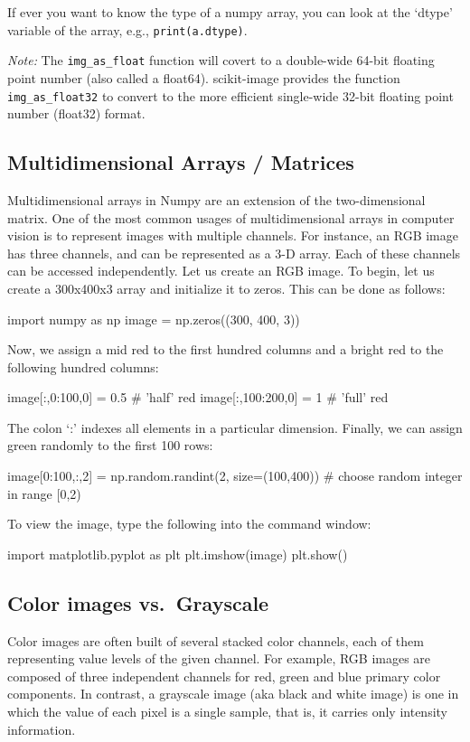 \documentclass{article}
\begin{document}
If ever you want to know the type of a numpy array, you can look at the `dtype' variable of the array, e.g., \texttt{print(a.dtype)}.

\emph{Note:} The \texttt{img\_as\_float} function will covert to a double-wide 64-bit floating point number (also called a float64). scikit-image provides the function \texttt{img\_as\_float32} to convert to the more efficient single-wide 32-bit floating point number (float32) format.

\subsection{Multidimensional Arrays / Matrices}
Multidimensional arrays in Numpy are an extension of the two-dimensional matrix. One of the most common usages of multidimensional arrays in computer vision is to represent images with multiple channels. For instance, an RGB image has three channels, and can be represented as a 3-D array. Each of these channels can be accessed independently.
Let us create an RGB image. To begin, let us create a 300x400x3 array and initialize it to zeros. This can be done as follows:
\begin{python}
import numpy as np
image = np.zeros((300, 400, 3))
\end{python}

Now, we assign a mid red to the first hundred columns and a bright red to the following hundred columns:
\begin{python}
image[:,0:100,0] = 0.5 # 'half' red
image[:,100:200,0] = 1 # 'full' red
\end{python}

The colon `:' indexes all elements in a particular dimension.
Finally, we can assign green randomly to the first 100 rows:
\begin{python}
image[0:100,:,2] = np.random.randint(2, size=(100,400))
# choose random integer in range [0,2)
\end{python}

To view the image, type the following into the command window:
\begin{python}
import matplotlib.pyplot as plt
plt.imshow(image)
plt.show()
\end{python}

\subsection{Color images vs.~Grayscale}
Color images are often built of several stacked color channels, each of them representing value levels of the given channel. For example, RGB images are composed of three independent channels for red, green and blue primary color components. In contrast, a grayscale image (aka black and white image) is one in which the value of each pixel is a single sample, that is, it carries only intensity information.
\end{document}
